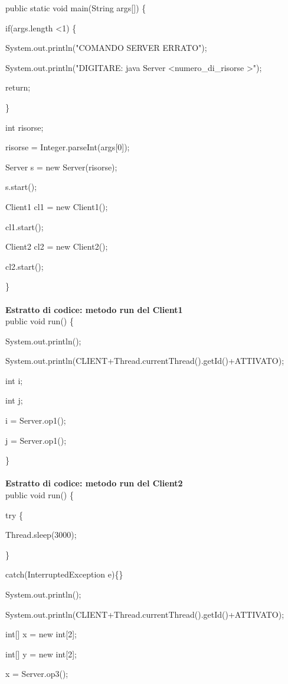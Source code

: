 \documentclass[10pt, a4paper]{article}
\begin{document}
public static void main(String args[]) \{

        if(args.length \textless 1) \{

            System.out.println("COMANDO SERVER ERRATO");

            System.out.println("DIGITARE: java Server \textless numero\_di\_risorse \textgreater");

            return;

        \}

        int risorse;

        risorse = Integer.parseInt(args[0]);

        Server s = new Server(risorse);

        s.start();

	Client1 cl1 = new Client1();

	cl1.start();

	Client2 cl2 = new Client2();

	cl2.start();

\}
\\\\
\textbf{Estratto di codice: metodo run del Client1}
\\

public void run() \{

		System.out.println();

        	System.out.println(CLIENT+Thread.currentThread().getId()+ATTIVATO);

		int i;

		int j;

		i = Server.op1();

		j = Server.op1();

\}
\\\\
\textbf{Estratto di codice: metodo run del Client2}
\\

public void run() \{

		try \{

			Thread.sleep(3000);

		\}
 
		catch(InterruptedException e)\{\}

		System.out.println();

        	System.out.println(CLIENT+Thread.currentThread().getId()+ATTIVATO);
		
		int[] x = new int[2];

		int[] y = new int[2];

		x = Server.op3();
\end{document}
